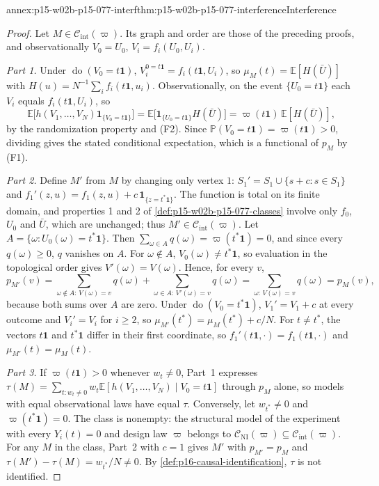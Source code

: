 \begin{annexitem}{annex:p15-w02b-p15-077-interf}{thm:p15-w02b-p15-077-interference}{Interference}
\begin{proof}
Let \(M\in\mathcal C_{\mathrm{int}}(\varpi)\). Its graph and order are
those of the preceding proofs, and observationally \(V_0=U_0\),
\(V_i=f_i(U_0,U_i)\).

\emph{Part 1.} Under \(\operatorname{do}(V_0=t\mathbf 1)\),
\(V_i^{0=t\mathbf 1}=f_i(t\mathbf 1,U_i)\), so
\(\mu_M(t)=\mathbb E[H(\bar U)]\) with
\(H(u)=N^{-1}\sum_if_i(t\mathbf 1,u_i)\). Observationally, on the event
\(\{U_0=t\mathbf 1\}\) each \(V_i\) equals \(f_i(t\mathbf 1,U_i)\),
so
\[
 \mathbb E\bigl[h(V_1,\ldots,V_N)\mathbf 1_{\{V_0=t\mathbf 1\}}\bigr]
 =\mathbb E\bigl[\mathbf 1_{\{U_0=t\mathbf 1\}}H(\bar U)\bigr]
 =\varpi(t\mathbf 1)\,\mathbb E[H(\bar U)],
\]
by the randomization property and (F2). Since
\(\mathbb P(V_0=t\mathbf 1)=\varpi(t\mathbf 1)>0\), dividing gives the
stated conditional expectation, which is a functional of \(p_M\) by (F1).

\emph{Part 2.} Define \(M'\) from \(M\) by changing only vertex \(1\):
\(S_1'=S_1\cup\{s+c:s\in S_1\}\) and
\(f_1'(z,u)=f_1(z,u)+c\,\mathbf 1_{\{z=t^*\mathbf 1\}}\). The function
is total on its finite domain, and properties 1 and 2 of
\cref{def:p15-w02b-p15-077-classes} involve only \(f_0\), \(U_0\) and
\(\bar U\), which are unchanged; thus
\(M'\in\mathcal C_{\mathrm{int}}(\varpi)\). Let
\(A=\{\omega:U_0(\omega)=t^*\mathbf 1\}\). Then
\(\sum_{\omega\in A}q(\omega)=\varpi(t^*\mathbf 1)=0\), and since every
\(q(\omega)\geq0\), \(q\) vanishes on \(A\). For \(\omega\notin A\),
\(V_0(\omega)\ne t^*\mathbf 1\), so evaluation in the topological order
gives \(V'(\omega)=V(\omega)\). Hence, for every \(v\),
\[
 p_{M'}(v)=\sum_{\omega\notin A:\,V(\omega)=v}q(\omega)
          +\sum_{\omega\in A:\,V'(\omega)=v}q(\omega)
          =\sum_{\omega:\,V(\omega)=v}q(\omega)=p_M(v),
\]
because both sums over \(A\) are zero. Under
\(\operatorname{do}(V_0=t^*\mathbf 1)\), \(V_1'=V_1+c\) at every outcome
and \(V_i'=V_i\) for \(i\geq2\), so \(\mu_{M'}(t^*)=\mu_M(t^*)+c/N\).
For \(t\ne t^*\), the vectors \(t\mathbf 1\) and \(t^*\mathbf 1\) differ
in their first coordinate, so \(f_1'(t\mathbf 1,\cdot)=f_1(t\mathbf 1,\cdot)\)
and \(\mu_{M'}(t)=\mu_M(t)\).

\emph{Part 3.} If \(\varpi(t\mathbf 1)>0\) whenever \(w_t\ne0\), Part~1
expresses \(\tau(M)=\sum_{t:w_t\ne0}w_t
\mathbb E[h(V_1,\ldots,V_N)\mid V_0=t\mathbf 1]\) through \(p_M\) alone,
so models with equal observational laws have equal \(\tau\). Conversely,
let \(w_{t^*}\ne0\) and \(\varpi(t^*\mathbf 1)=0\). The class is
nonempty: the structural model of the experiment with every
\(Y_i(t)=0\) and design law \(\varpi\) belongs to
\(\mathcal C_{\mathrm{NI}}(\varpi)\subseteq\mathcal C_{\mathrm{int}}(\varpi)\).
For any \(M\) in the class, Part~2 with \(c=1\) gives \(M'\) with
\(p_{M'}=p_M\) and \(\tau(M')-\tau(M)=w_{t^*}/N\ne0\). By
\cref{def:p16-causal-identification}, \(\tau\) is not identified.


\end{proof}
\end{annexitem}
